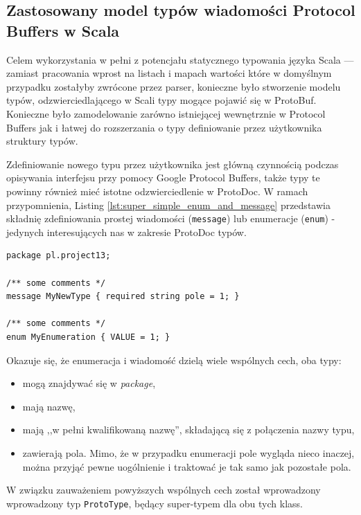\documentclass[pdflatex,11pt]{aghdpl}
\begin{document}
\subsection{Zastosowany model typów wiadomości Protocol Buffers w Scala}
\label{the_types}
Celem wykorzystania w pełni z potencjału statycznego typowania języka Scala --- zamiast pracowania wprost na listach i mapach wartości które 
w domyślnym przypadku zostałyby zwrócone przez parser, konieczne było stworzenie modelu typów, odzwierciedlającego w Scali typy mogące pojawić się w ProtoBuf.
Konieczne było zamodelowanie zarówno istniejącej wewnętrznie w Protocol Buffers jak i łatwej do rozszerzania o typy definiowanie przez użytkownika struktury typów.

Zdefiniowanie nowego typu przez użytkownika jest główną czynnością podczas opisywania interfejsu przy pomocy Google Protocol Buffers, także typy te powinny
również mieć istotne odzwierciedlenie w ProtoDoc. W ramach przypomnienia, Listing \ref{lst:super_simple_enum_and_message} przedstawia składnię zdefiniowania prostej 
wiadomości (\verb|message|) lub enumeracje (\verb|enum|) - jedynych interesujących nas w zakresie ProtoDoc typów. 

\begin{lstlisting}[caption={Przykład zdefiniowania nowych typów w Protocol Buffers IDL}, label={lst:super_simple_enum_and_message}]
package pl.project13;

/** some comments */
message MyNewType { required string pole = 1; }

/** some comments */
enum MyEnumeration { VALUE = 1; }
\end{lstlisting}

Okazuje się, że enumeracja i wiadomość dzielą wiele wspólnych cech, oba typy:
\begin{itemize}
 \item mogą znajdywać się w \textit{package},
 \item mają nazwę,
 \item mają ,,w pełni kwalifikowaną nazwę'', składającą się z połączenia nazwy typu,
 \item zawierają pola. Mimo, że w przypadku enumeracji pole wygląda nieco inaczej, można przyjąć pewne uogólnienie i traktować je tak samo jak pozostałe pola.
\end{itemize}

W związku zauważeniem powyższych wspólnych cech został wprowadzony wprowadzony typ \verb|ProtoType|, będący super-typem dla obu tych klass.
\end{document}

